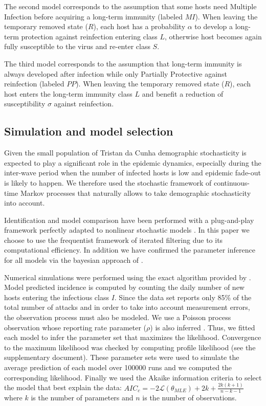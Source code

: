 The second model corresponds to the assumption that some hosts need
Multiple Infection before acquiring a long-term immunity (labeled
$MI$). When leaving the temporary removed state ($R$), each host has a
probability $\alpha$ to develop a long-term protection against
reinfection entering class $L$, otherwise host becomes again fully
susceptible to the virus and re-enter class $S$.

The third model corresponds to the assumption that long-term immunity
is always developed after infection while only Partially Protective
against reinfection (labeled $PP$). When leaving the temporary removed
state ($R$), each host enters the long-term immunity class $L$ and
benefit a reduction of susceptibility $\sigma$ against reinfection.

\subsection{Simulation and model selection} 


Given the small population of Tristan da Cunha demographic
stochasticity is expected to play a significant role in the epidemic
dynamics, especially during the inter-wave period when the number of
infected hosts is low and epidemic fade-out is likely to happen. We
therefore used the stochastic framework of continuous-time Markov
processes that naturally allows to take demographic stochasticity into
account.

Identification and model comparison have been performed with a
plug-and-play framework perfectly adapted to nonlinear stochastic
models \citep{Ionides2006,Breto2009,Toni2009}. In this paper we choose
to use the frequentist framework of iterated filtering
\citep{Ionides2006,King2008} due to its computational efficiency. In
addition we have confirmed the parameter inference for all models via
the bayesian approach of \citet{Toni2009}.

Numerical simulations were performed using the exact algorithm
provided by \citet{Gillespie1977}. Model predicted incidence is
computed by counting the daily number of new hosts entering the
infectious class $I$. Since the data set reports only 85\% of the
total number of attacks and in order to take into account measurement
errors, the observation process must also be modeled. We use a Poisson
process observation whose reporting rate parameter ($\rho$) is also
inferred \citep{Ionides2006,Breto2009}. Thus, we fitted each model to
infer the parameter set that maximizes the likelihood. Convergence to
the maximum likelihood was checked by computing profile likelihood
(see the supplementary document). These parameter sets were used to
simulate the average prediction of each model over 100000 runs and we
computed the corresponding likelihood. Finally we used the Akaike
information criteria to select the model that best explain the data:
$AIC_c=-2\mathcal{L}(\theta_{MLE})+2k+\frac{2k(k+1)}{n-k-1}$ where $k$
is the number of parameters and $n$ is the number of observations.



